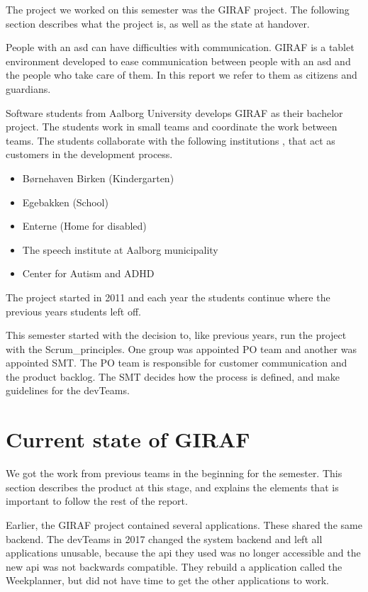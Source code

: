 The project we worked on this semester was the GIRAF project. The following section describes what the project is, as well as the state at handover.

People with an \gls{asd} can have difficulties with communication. GIRAF is a tablet environment developed to ease communication between people with an \gls{asd} and the people who take care of them. In this report we refer to them as \glspl{citizen} and \glspl{guardian}.

Software students from Aalborg University develops GIRAF as their bachelor project. The students work in small teams and coordinate the work between teams. The students collaborate with the following institutions \cite{GirafWebsite}, that act as customers in the development process.

\begin{itemize}
    \item Børnehaven Birken (Kindergarten) \cite{bhBirken}
    \item Egebakken (School) \cite{egebakken}
    \item Enterne (Home for disabled) \cite{enterne}
    \item The speech institute at Aalborg municipality
    \item Center for Autism and ADHD \cite{center_for_autism}
\end{itemize}

The project started in 2011 and each year the students continue where the previous years students left off.

This semester started with the decision to, like previous years, run the project with the \gls{Scrum_principles}. One group was appointed \gls{PO} team and another was appointed \gls{SMT}. The \gls{PO} team is responsible for customer communication and the product backlog. The \gls{SMT} decides how the process is defined, and make guidelines for the \glspl{devTeam}.

\section{Current state of GIRAF}

We got the work from previous teams in the beginning for the semester. This section describes the product at this stage, and explains the elements that is important to follow the rest of the report.

Earlier, the GIRAF project contained several applications. These shared the same backend. The \glspl{devTeam} in 2017 changed the system backend\cite{SW608F18} and left all applications unusable, because the \gls{api} they used was no longer accessible and the new \gls{api} was not backwards compatible. They rebuild a application called the Weekplanner, but did not have time to get the other applications to work. 

